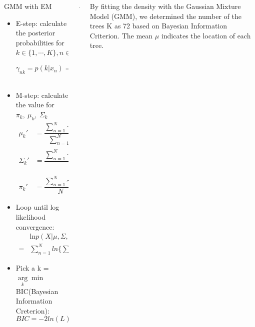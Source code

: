 \documentclass[final]{beamer}
\begin{document}
\begin{frame}
\begin{columns}[t]
\begin{column}{\colwidth}
\begin{tcolorbox}[width=\colwidth,height=\contentheight,top=.2in]
\begin{block}{GMM with EM}
    \begin{itemize}
        \item E-step: calculate the posterior probabilities for $k\in\{1,\cdots,K\}, n\in\{1,\cdots,N\}$ $$ \gamma_{nk}=p(k|x_n)=\dfrac{\pi_k\mathcal{N}(x_n|\mu_n,\Sigma_n)}{\sum_{j=1}^K\pi_j\mathcal{N}(x_n|\mu_j,\Sigma_j) } $$
        \item M-step: calculate the value for $\pi_k,\ \mu_k,\ \Sigma_k$
        \begin{align*}
            \mu_k' & = \dfrac{\sum_{n=1}^N\gamma_{nk}x_n}{\sum_{n=1}^N\gamma_{nk}}\\
            \Sigma_k' & = \dfrac{\sum_{n=1}^N\gamma_{nk}(x_n-\mu_k')(x_n-\mu_k')^T}{\sum_{n=1}^N\gamma_{nk}}\\
            \pi_k' &= \dfrac{\sum_{n=1}^N\gamma_{nk}}{N}
        \end{align*}
        \item Loop until log likelihood convergence:
        \begin{align*}
            & \text{ln}p(X|\mu,\Sigma,\pi)\\
            =&  \sum\limits_{n=1}^Nln\{\sum_{k=1}^K\pi_k\mathcal{N}(x_n|\mu_k,\Sigma_k)\}
        \end{align*}
        \item Pick a k = $\arg\limits_k\min$ BIC(Bayesian Information Creterion):
        $$ BIC = -2ln(L)+ln(N)*K $$
    \end{itemize}


\end{block}

\vspace{-.5in}



\end{tcolorbox}
\end{column}

\begin{column}{\marginwidth-\parsep}\end{column} %

\begin{column}{\colwidth} %
\begin{tcolorbox}[width=\colwidth,height=\contentheight,top=.2in]

By fitting the density with the Gaussian Mixture Model (GMM), we determined the number of the trees K as 72 based on Bayesian Information Criterion. The mean $\mu$ indicates the location of each tree. 

\vspace{.2in}


\end{tcolorbox}
\end{column}
\end{columns}
\end{frame}
\end{document}
